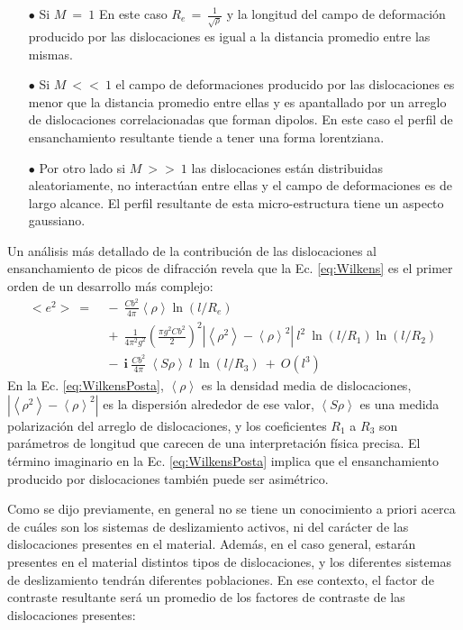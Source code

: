 \begin{itemize}
  \item[$\bullet$] Si $M \ = \ 1 $ En este caso $R_e\,=\,\frac{1}{\sqrt{\rho}}$ y la longitud del campo de deformación producido por las dislocaciones es igual a la distancia promedio entre las mismas.
  \item[$\bullet$] Si $M \ << \ 1 $ el campo de deformaciones producido por las dislocaciones es menor que la distancia promedio entre ellas y es apantallado por un arreglo de dislocaciones correlacionadas que forman dipolos. En este caso el perfil de ensanchamiento resultante tiende a tener una forma lorentziana.
  \item[$\bullet$] Por otro lado si $M \ >> \ 1 $ las dislocaciones están distribuidas aleatoriamente, no interactúan entre ellas y el campo de deformaciones es de largo alcance. El perfil resultante de esta micro-estructura tiene un aspecto gaussiano.
\end{itemize}

Un análisis más detallado de la contribución de las dislocaciones al ensanchamiento de picos de difracción revela que la Ec. \ref{eq:Wilkens} es el primer orden de un desarrollo más complejo\cite{Groma1988}:
\begin{equation}
  \begin{split}
      <e^2> \ = & \ - \ \frac{Cb^2}{4 \pi}\left< \rho \right> \ln \left( l/R_e \right) \ \\
     & \ +  \ \frac{1}{4\pi^2g^2} \left( \frac{\pi g^2 C b^2}{2} \right)^2 |\left<\rho^2\right> - \left< \rho \right>^2| \ l^2 \ \ln(l/R_1) \ln(l/R_2) \ \\
     & \ - \ \mathbf{i} \ \frac{Cb^2}{4\pi} \ \left< S\rho \right> \ l \ \ln(l/R_3) \ + \ O(l^3)
  \end{split}
  \label{eq:WilkensPosta}
\end{equation}
\noindent
En la Ec. \ref{eq:WilkensPosta}, $\left< \rho \right>$ es la densidad media de dislocaciones, $|\left<\rho^2\right> - \left< \rho \right>^2|$ es la dispersión alrededor de ese valor, $\left< S\rho \right>$ es una medida polarización del arreglo de dislocaciones, y los coeficientes $R_1$ a $R_3$ son parámetros de longitud que carecen de una interpretación física precisa.
El término imaginario en la Ec. \ref{eq:WilkensPosta} implica que el ensanchamiento producido por dislocaciones también puede ser asimétrico.

Como se dijo previamente, en general no se tiene un conocimiento a priori acerca de cuáles son los sistemas de deslizamiento activos, ni del carácter de las dislocaciones presentes en el material. Además, en el caso general, estarán presentes en el material distintos tipos de dislocaciones, y los diferentes sistemas de deslizamiento tendrán diferentes poblaciones. En ese contexto, el factor de contraste resultante será un promedio de los factores de contraste de las dislocaciones presentes:

